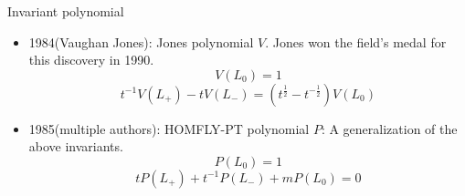 \begin{frame}{Invariant polynomial}
\begin{itemize}
    \item 1984(Vaughan Jones): Jones polynomial $V$. Jones won the field's medal for this discovery in 1990.
    $$V(L_0) = 1$$
    $$t^{-1}V(L_+) - tV(L_-) = (t^{\frac{1}{2}} - t^{-\frac{1}{2}})V(L_0)$$
    \item 1985(multiple authors): HOMFLY-PT polynomial $P$: A generalization of the above invariants.
    $$P(L_0) = 1$$
    $$tP(L_+) + t^{-1}P(L_-) + mP(L_0) = 0$$
\end{itemize}
\end{frame}